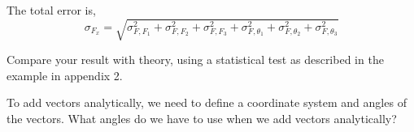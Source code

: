 The total error is, 
\begin{equation*}
\sigma_{F_x} = \sqrt{\sigma_{F,F_1}^2+\sigma_{F,F_2}^2+\sigma_{F,F_3}^2+\sigma_{F,\theta_1}^2+\sigma_{F,\theta_2}^2+\sigma_{F,\theta_3}^2}
\end{equation*}

Compare your result with theory, using a statistical test as described in the example in appendix 2.

\prelab

\prelabquestion To add vectors analytically, we need to define a coordinate system and angles of the vectors. What angles do we have to use when we add vectors analytically?

